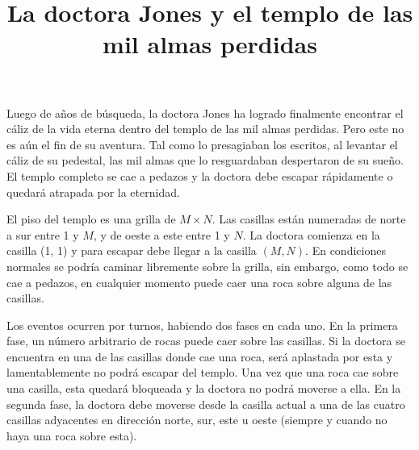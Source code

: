 \documentclass{oci}
\title{La doctora Jones y el templo de las mil almas perdidas}
\begin{document}
\begin{problemDescription}
  Luego de años de búsqueda, la doctora Jones ha logrado finalmente encontrar el cáliz de la vida
  eterna dentro del templo de las mil almas perdidas.
  Pero este no es aún el fin de su aventura.
  Tal como lo presagiaban los escritos, al levantar el cáliz de su pedestal, las mil almas que lo
  resguardaban despertaron de su sueño.
  El templo completo se cae a pedazos y la doctora debe escapar rápidamente o quedará atrapada por
  la eternidad.

  El piso del templo es una grilla de $M\times N$.
  Las casillas están numeradas de norte a sur entre 1 y $M$, y de oeste a este entre 1 y $N$.
  La doctora comienza en la casilla (1, 1) y para escapar debe llegar a la casilla $(M, N)$.
  En condiciones normales se podría caminar libremente sobre la grilla, sin embargo, como todo se
  cae a pedazos, en cualquier momento puede caer una roca sobre alguna de las casillas.

  Los eventos ocurren por turnos, habiendo dos fases en cada uno.
  En la primera fase, un número arbitrario de rocas puede caer sobre las casillas.
  Si la doctora se encuentra en una de las casillas donde cae una roca, será aplastada por esta y
  lamentablemente no podrá escapar del templo.
  Una vez que una roca cae sobre una casilla, esta quedará bloqueada y la doctora no podrá moverse
  a ella.
  En la segunda fase, la doctora debe moverse desde la casilla actual a una de las cuatro casillas
  adyacentes en dirección norte, sur, este u oeste (siempre y cuando no haya una roca sobre esta).


\end{problemDescription}
\end{document}
